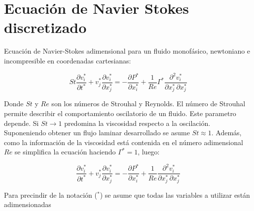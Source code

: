\section{Ecuación de Navier Stokes discretizado}

Ecuación de Navier-Stokes adimensional para un fluido monofásico, newtoniano e incompresible en coordenadas cartesianas:

\begin{equation}
St \dfrac{\partial v_i^*}{\partial t^*} + v_j^* \dfrac{\partial v_i^*}{\partial x_j^*} = - \dfrac{\partial P^*}{\partial x_i^*} + \dfrac{1}{Re} \Gamma^* \dfrac{\partial^2 v_i^*}{\partial x_j^* \, \partial x_j^*}
\end{equation}

Donde $St$ y $Re$ son los números de Strouhal y Reynolds. El número de Strouhal permite describir el comportamiento oscilatorio de un fluido. Este parametro depende. Si $St \rightarrow 1$ predomina la viscosidad respecto a la oscilación. Suponeniendo obtener un flujo laminar desarrollado se asume $St \approx 1$. Además, como la información de la viscosidad está contenida en el número adimensional $Re$ se simplifica la ecuación haciendo $\Gamma^* = 1$, luego:

\begin{equation}
\dfrac{\partial v_i^*}{\partial t^*} + v_j^* \dfrac{\partial v_i^*}{\partial x_j^*} = - \dfrac{\partial P^*}{\partial x_i^*} + \dfrac{1}{Re} \dfrac{\partial^2 v_i^*}{\partial x_j^* \, \partial x_j^*}
\end{equation}  

Para precindir de la notación ($^*$) se asume que todas las variables a utilizar están adimensionadas

